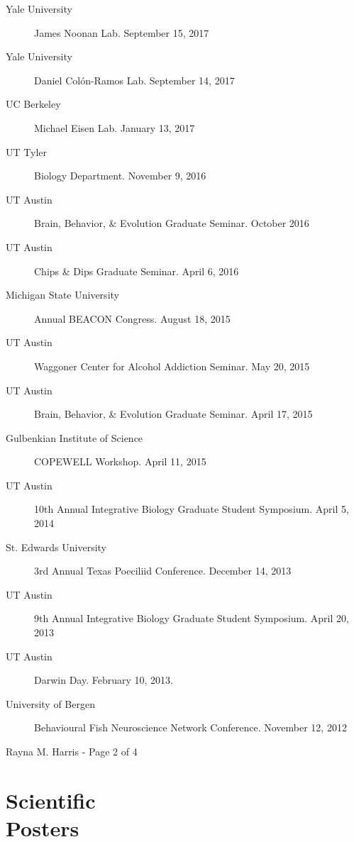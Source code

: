 \documentclass[margin,line]{CV}
\begin{document}
\begin{resume}
\begin{description}
\item[Yale University] James Noonan Lab. September 15, 2017
\item[Yale University] Daniel Col\'on-Ramos Lab. September 14, 2017
\item[UC Berkeley] Michael Eisen Lab. January 13, 2017
\item[UT Tyler] Biology Department. November 9, 2016
\item[UT Austin] Brain, Behavior, \& Evolution Graduate Seminar. October 2016
\item[UT Austin] Chips \& Dips Graduate Seminar. April 6, 2016
\item[Michigan State University] Annual BEACON Congress. August 18, 2015 
\item[UT Austin] Waggoner Center for Alcohol Addiction Seminar. May 20, 2015
\item[UT Austin] Brain, Behavior, \& Evolution Graduate Seminar. April 17, 2015
\item[Gulbenkian Institute of Science] COPEWELL Workshop. April 11, 2015
\item[UT Austin] 10th Annual Integrative Biology Graduate Student Symposium. April 5, 2014
\item[St. Edwards University] 3rd Annual Texas Poeciliid Conference. December 14, 2013 
\item[UT Austin] 9th Annual Integrative Biology Graduate Student Symposium. April 20, 2013
\item[UT Austin] Darwin Day. February 10, 2013.
\item[University of Bergen] Behavioural Fish Neuroscience Network Conference. November 12, 2012

\end{description}




\vspace{0.5 cm}
{\centerline {Rayna M. Harris - Page 2 of 4}}
\newpage




\section{\mysidestyle Scientific\\Posters}


\end{resume}
\end{document}
